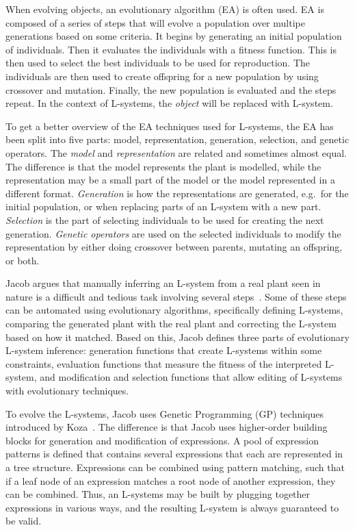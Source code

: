 When evolving objects, an evolutionary algorithm (EA) is often used.
EA is composed of a series of steps that will evolve a population over multipe generations based on some criteria.
It begins by generating an initial population of individuals.
Then it evaluates the individuals with a fitness function.
This is then used to select the best individuals to be used for reproduction.
The individuals are then used to create offspring for a new population by using crossover and mutation.
Finally, the new population is evaluated and the steps repeat.
In the context of L-systems, the \textit{object} will be replaced with L-system.

To get a better overview of the EA techniques used for L-systems, the EA has been split into five parts: model, representation, generation, selection, and genetic operators.
The \textit{model} and \textit{representation} are related and sometimes almost equal.
The difference is that the model represents the plant is modelled, while the representation may be a small part of the model or the model represented in a different format.
\textit{Generation} is how the representations are generated, e.g.\ for the initial population, or when replacing parts of an L-system with a new part.
\textit{Selection} is the part of selecting individuals to be used for creating the next generation.
\textit{Genetic operators} are used on the selected individuals to modify the representation by either doing crossover between parents, mutating an offspring, or both.

Jacob argues that manually inferring an L-system from a real plant seen in nature is a difficult and tedious task involving several steps~\cite{Jacob1998}.
Some of these steps can be automated using evolutionary algorithms, specifically defining L-systems, comparing the generated plant with the real plant and correcting the L-system based on how it matched.
Based on this, Jacob defines three parts of evolutionary L-system inference: generation functions that create L-systems within some constraints, evaluation functions that measure the fitness of the interpreted L-system, and modification and selection functions that allow editing of L-systems with evolutionary techniques.

To evolve the L-systems, Jacob uses Genetic Programming (GP) techniques introduced by Koza~\cite{Koza1993}.
The difference is that Jacob uses higher-order building blocks for generation and modification of expressions.
A pool of expression patterns is defined that contains several expressions that each are represented in a tree structure.
Expressions can be combined using pattern matching, such that if a leaf node of an expression matches a root node of another expression, they can be combined.
Thus, an L-systems may be built by plugging together expressions in various ways, and the resulting L-system is always guaranteed to be valid.

